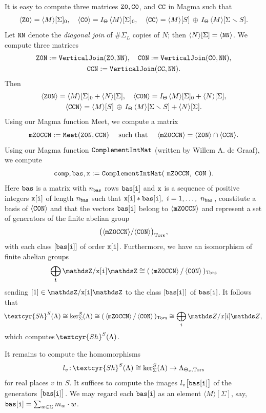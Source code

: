\documentclass[11pt]{amsart}
\renewcommand{\mathbb}{\mathds}
\newcommand{\Sha}{{\!\textcyr{Sh}}}
\theoremstyle{plain}
\theoremstyle{definition}
\newcommand{\Z}{{\mathbb Z}}
\newcommand{\hs}{\kern 0.8pt}
\newcommand{\Tors}{{\rm Tors}}
\newcommand{\Thvt}{{\Theta_v,\Tors}}
\newcommand{\la}{\langle}
\newcommand{\ra}{\rangle}
\begin{document}
It is easy to compute  three matrices
$\tt Z0, C0$, and $\tt CC$ in Magma such that
\begin{gather*}
\la{\tt Z0}\ra=\la M\ra[\Sigma]_0,\quad \la{\tt C0}\ra=  I_\Theta\,\la M\ra[\Sigma]_0,\quad
\la{\tt CC}\ra= \la M\ra[S]\,\oplus\, I_\Theta\,\la M\ra[\Sigma\smallsetminus S].
\end{gather*}
Let $\tt NN$ denote the {\em diagonal join}
of $\#\Sigma_L$ copies of $N$;
then $\la N\ra[\Sigma]={\tt\la NN\ra}$.
We compute three matrices
\begin{gather*}\tt Z0N:=VerticalJoin(Z0,NN),\quad
C0N:=VerticalJoin(C0,NN),\\
\tt CCN:=VerticalJoin(CC,NN).
\end{gather*}
Then
\begin{gather*}
{\tt \la Z0N\ra}=\la M\ra[\Sigma]_0 + \la N\ra[\Sigma],\quad
\la{\tt C0N}\ra=  I_\Theta\,\la M\ra[\Sigma]_0 + \la N\ra[\Sigma],\\
\la{\tt CCN}\ra= \la M\ra[S]\,\oplus\, I_\Theta\,\la M\ra[\Sigma\smallsetminus S]
+ \la N\ra[\Sigma].
\end{gather*}
Using our Magma function Meet, we compute a matrix
\[\tt mZ0CCN:=Meet(Z0N, CCN)\quad\
\text{such that}\quad\
\tt \la mZ0CCN\ra=\la Z0N\ra\cap\la CCN\ra .
\]
Using our Magma function ${\tt ComplementIntMat}$ (written by Willem A. de Graaf),
we compute
\[\tt comp, bas, x := ComplementIntMat(\ mZ0CCN,\  C0N\ ).\]
Here $\tt bas$ is a matrix with $n_{\tt bas}$ rows $\tt bas[i]$
and $\tt x$ is a sequence of positive integers $\tt x[i]$ of length $n_{\tt bas}$
such that  ${\tt x[i]* bas[i]}, \ i=1,\dots,\ n_{\tt bas}\hs$,
constitute a basis of $\tt \la C0N\ra$
and that  the vectors $\tt bas[i]$ belong to $\tt \la mZ0CCN\ra$
and represent a set of generators of the finite abelian group
\begin{equation*}
\tt \big(\la mZ0CCN\ra/  \la C0N\ra\big)_\Tors\hs ,
\end{equation*}
with each class $\tt [bas[i]]$ of order $\tt x[i]$.
Furthermore, we have an isomorphism of finite abelian groups
\[\tt \bigoplus_i \Z/x[i]\Z
\cong(\,{\tt\la mZ0CCN\ra\, /\,  \la C0N \ra}\, )_{\rm Tors}\]
sending $[1]\in \tt \Z/x[i]\Z$ to the class $\tt [bas[i]\hs]$ of $\tt bas[i]$.
It follows that
\[\Sha^S(\Lambda)\cong \ker_\Sigma^S(\Lambda)
\cong (\,{\tt\la mZ0CCN\ra\, /\,  \la C0N \ra}\, )_{\rm Tors}\cong \bigoplus_i \Z/x[i]\Z,\]
which computes $\Sha^S(\Lambda)$.

It remains to compute the homomorphisms
\begin{equation}\label{e:lvv} l_v\colon \Sha^S(\Lambda)\cong\ker_\Sigma^S(\Lambda)\to \Lambda_\Thvt
\end{equation}
for real places $v$ in $S$.
It suffices to compute the images
$l_v\tt\big[ bas[i]\big]$ of the generators
$\tt \big[ bas[i]\big]$.
We may regard each  $\tt bas[i]$ as an element $\la M\ra[\Sigma]$,
say, ${\tt bas[i]}=\sum_{w\in\Sigma} m_w\cdot w$.
\end{document}

